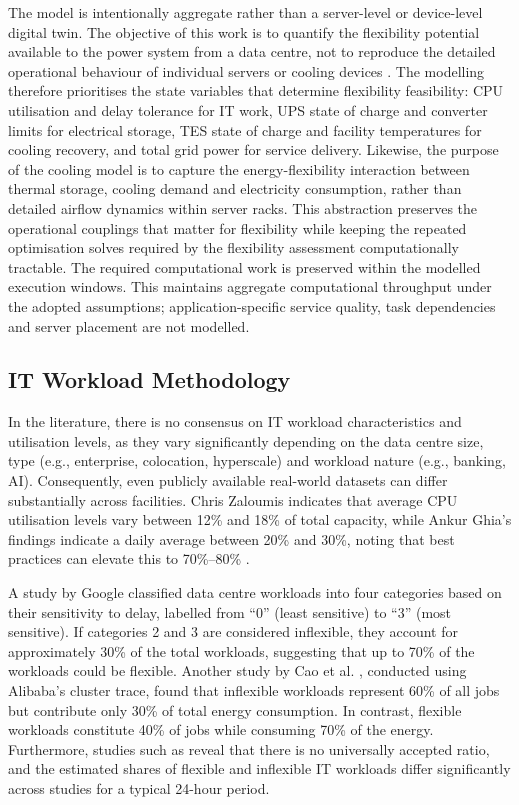 \documentclass[lettersize,journal]{IEEEtran}
\begin{document}
The model is intentionally aggregate rather than a server-level or device-level digital twin. The objective of this work is to quantify the flexibility potential available to the power system from a data centre, not to reproduce the detailed operational behaviour of individual servers or cooling devices \cite{barroso2018datacenter,dayarathna2015data}. The modelling therefore prioritises the state variables that determine flexibility feasibility: CPU utilisation and delay tolerance for IT work, UPS state of charge and converter limits for electrical storage, TES state of charge and facility temperatures for cooling recovery, and total grid power for service delivery. Likewise, the purpose of the cooling model is to capture the energy-flexibility interaction between thermal storage, cooling demand and electricity consumption, rather than detailed airflow dynamics within server racks. This abstraction preserves the operational couplings that matter for flexibility while keeping the repeated optimisation solves required by the flexibility assessment computationally tractable. The required computational work is preserved within the modelled execution windows. This maintains aggregate computational throughput under the adopted assumptions; application-specific service quality, task dependencies and server placement are not modelled.

\label{sec: methodology}
\subsection{IT Workload Methodology}\label{sec:it-workload-methodology}
 
In the literature, there is no consensus on IT workload characteristics and utilisation levels, as they vary significantly depending on the data centre size, type (e.g., enterprise, colocation, hyperscale) and workload nature (e.g., banking, AI). Consequently, even publicly available real-world datasets can differ substantially across facilities. Chris Zaloumis \cite{Zaloumis2022IBM} indicates that average CPU utilisation levels vary between 12\% and 18\% of total capacity, while Ankur Ghia's findings indicate a daily average between 20\% and 30\%, noting that best practices can elevate this to 70\%--80\% \cite{Ghia2011McKinsey}. 
 
 A study by Google \cite{6779441} classified data centre workloads into four categories based on their sensitivity to delay, labelled from ``0'' (least sensitive) to ``3'' (most sensitive). If categories 2 and 3 are considered inflexible, they account for approximately 30\% of the total workloads, suggesting that up to 70\% of the workloads could be flexible. Another study by Cao et al. \cite{Cao2022ApEn}, conducted using Alibaba’s cluster trace, found that inflexible workloads represent 60\% of all jobs but contribute only 30\% of total energy consumption. In contrast, flexible workloads constitute 40\% of jobs while consuming 70\% of the energy. Furthermore, studies such as \cite{Misaghian2023TIA,Xu2023SPIE,Zhou2024IJEPES,Fu2020ApEn,Liu2012PER} reveal that there is no universally accepted ratio, and the estimated shares of flexible and inflexible IT workloads differ significantly across studies for a typical 24-hour period. 
\end{document}
